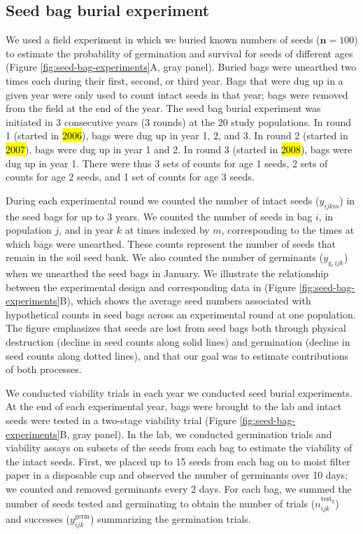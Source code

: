 \documentclass[12pt, oneside, titlepage]{article}   	%
\begin{document}
\subsection{Seed bag burial experiment}

We used a field experiment in which we buried known numbers of seeds ($\bm{n}=100$) to estimate the probability of germination and survival for seeds of different ages (Figure \ref{fig:seed-bag-experiments}A, gray panel). Buried bags were unearthed two times each during their first, second, or third year. Bags that were dug up in a given year were only used to count intact seeds in that year; bags were removed from the field at the end of the year. The seed bag burial experiment was initiated in 3 consecutive years (3 rounds) at the 20 study populations. In round 1 (started in \hl{2006}), bags were dug up in year 1, 2, and 3. In round 2 (started in \hl{2007}), bags were dug up in year 1 and 2. In round 3 (started in \hl{2008}), bags were dug up in year 1. There were thus 3 sets of counts for age 1 seeds, 2 sets of counts for age 2 seeds, and 1 set of counts for age 3 seeds. 

During each experimental round we counted the number of intact seeds ($y_{ijkm}$) in the seed bags for up to 3 years. We counted the number of seeds in bag $i$, in population $j$, and in year $k$ at times indexed by $m$, corresponding to the times at which bags were unearthed. These counts represent the number of seeds that remain in the soil seed bank. We also counted the number of germinants ($y_{\mathrm{g},ijk}$) when we unearthed the seed bags in January. We illustrate the relationship between the experimental design and corresponding data in (Figure \ref{fig:seed-bag-experiments}B), which shows the average seed numbers associated with hypothetical counts in seed bags across an experimental round at one population. The figure emphasizes that seeds are lost from seed bags both through physical destruction (decline in seed counts along solid lines) and germination (decline in seed counts along dotted lines), and that our goal was to estimate contributions of both processes. 

We conducted viability trials in each year we conducted seed burial experiments. At the end of each experimental year, bags were brought to the lab and intact seeds were tested in a two-stage viability trial (Figure \ref{fig:seed-bag-experiments}B, gray panel). In the lab, we conducted germination trials and viability assays on subsets of the seeds from each bag to estimate the viability of the intact seeds. First, we placed up to 15 seeds from each bag on to moist filter paper in a disposable cup and observed the number of germinants over 10 days; we counted and removed germinants every 2 days. For each bag, we summed the number of seeds tested and germinating to obtain the number of trials ($n^\mathrm{test_g}_{ijk}$) and successes ($y^{\mathrm{germ}}_{ijk}$) summarizing the germination trials. 
\end{document}
